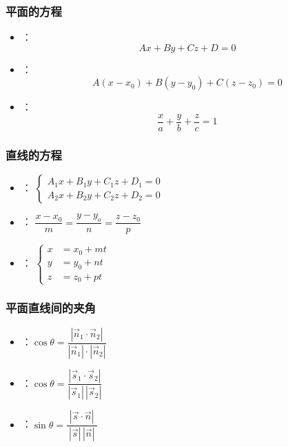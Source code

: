 \documentclass[14pt,notheorems,leqno,xcolor={rgb}]{beamer} %
\begin{document}
\begin{frame}
\frametitle{平面的方程}
\begin{itemize}
  \item {}：$$Ax+By+Cz+D=0$$
  \item {}：$$A(x-x_0)+B(y-y_0)+C(z-z_0)=0$$
  \item {}：$$\frac{x}a+\frac{y}b+\frac{z}c=1$$
\end{itemize}
\end{frame}

\begin{frame}
\frametitle{直线的方程}
\begin{itemize}
  \item {}：
    $\left\{\begin{aligned}
    A_1x+B_1y+C_1z+D_1=0\\
    A_2x+B_2y+C_2z+D_2=0
    \end{aligned}\right.$
  \item {}：
    $\dfrac{x-x_0}m = \dfrac{y-y_o}n = \dfrac{z-z_0}p$
  \item {}：
    $\left\{\begin{aligned}
      x &= x_0 + mt\\
      y &= y_0 + nt\\
      z &= z_0 + pt
    \end{aligned}\right.$
\end{itemize}
\end{frame}

\begin{frame}
\frametitle{平面直线间的夹角}
\begin{itemize}
  \item {}：$\cos\theta=\dfrac{|\vec{n}_1\cdot\vec{n}_2|}{|\vec{n}_1|\cdot|\vec{n}_2|}$
  \item {}：$\cos\theta=\dfrac{|\vec s_1\cdot\vec s_2|}{|\vec s_1|\,|\vec s_2|}$
  \item {}：$\sin\theta=\dfrac{|\vec s\cdot\vec n|}{\ |\vec s|\,|\vec n|\ }$
\end{itemize}
\end{frame}
\end{document}
